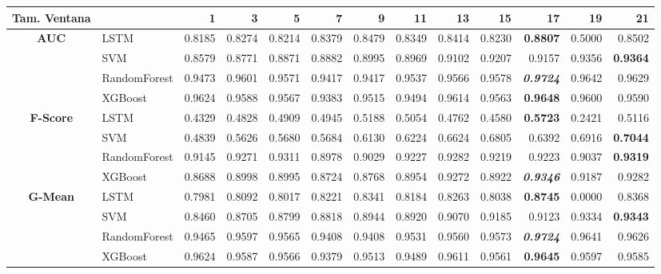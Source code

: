 \begin{table}[H]
	\centering
	\begin{adjustbox}{max width=14cm}
		\begin{tabular}{|c|l|r|r|r|r|r|r|r|r|r|r|r|}
			\hline
			\textbf{Tam. Ventana}&         &      1  &      3  &      5  &      7  &      9  &      11 &      13 &      15 &      17 &      19 &      21 \\
			\hline
			\textbf{AUC} &  LSTM &  0.8185 &  0.8274 &  0.8214 &  0.8379 &  0.8479 &  0.8349 &  0.8414 &  0.8230 & \textbf{  0.8807 } &  0.5000 &  0.8502 \\
			&  SVM &  0.8579 &  0.8771 &  0.8871 &  0.8882 &  0.8995 &  0.8969 &  0.9102 &  0.9207 &  0.9157 &  0.9356 & \textbf{  0.9364 } \\
			&  RandomForest &  0.9473 &  0.9601 &  0.9571 &  0.9417 &  0.9417 &  0.9537 &  0.9566 &  0.9578 & \textit{ \textbf{  0.9724 } } &  0.9642 &  0.9629 \\
			&  XGBoost &  0.9624 &  0.9588 &  0.9567 &  0.9383 &  0.9515 &  0.9494 &  0.9614 &  0.9563 & \textbf{  0.9648 } &  0.9600 &  0.9590 \\
			\hline
			\textbf{F-Score} &  LSTM &  0.4329 &  0.4828 &  0.4909 &  0.4945 &  0.5188 &  0.5054 &  0.4762 &  0.4580 & \textbf{  0.5723 } &  0.2421 &  0.5116 \\
			&  SVM &  0.4839 &  0.5626 &  0.5680 &  0.5684 &  0.6130 &  0.6224 &  0.6624 &  0.6805 &  0.6392 &  0.6916 & \textbf{  0.7044 } \\
			&  RandomForest &  0.9145 &  0.9271 &  0.9311 &  0.8978 &  0.9029 &  0.9227 &  0.9282 &  0.9219 &  0.9223 &  0.9037 & \textbf{  0.9319 } \\
			&  XGBoost &  0.8688 &  0.8998 &  0.8995 &  0.8724 &  0.8768 &  0.8954 &  0.9272 &  0.8922 & \textit{ \textbf{  0.9346 } } &  0.9187 &  0.9282 \\
			\hline
			\textbf{G-Mean} &  LSTM &  0.7981 &  0.8092 &  0.8017 &  0.8221 &  0.8341 &  0.8184 &  0.8263 &  0.8038 & \textbf{  0.8745 } &  0.0000 &  0.8368 \\
			&  SVM &  0.8460 &  0.8705 &  0.8799 &  0.8818 &  0.8944 &  0.8920 &  0.9070 &  0.9185 &  0.9123 &  0.9334 & \textbf{  0.9343 } \\
			&  RandomForest &  0.9465 &  0.9597 &  0.9565 &  0.9408 &  0.9408 &  0.9531 &  0.9560 &  0.9573 & \textit{ \textbf{  0.9724 } } &  0.9641 &  0.9626 \\
			&  XGBoost &  0.9624 &  0.9587 &  0.9566 &  0.9379 &  0.9513 &  0.9489 &  0.9611 &  0.9561 & \textbf{  0.9645 } &  0.9597 &  0.9585 \\

\end{tabular}
\end{adjustbox}
\end{table}
